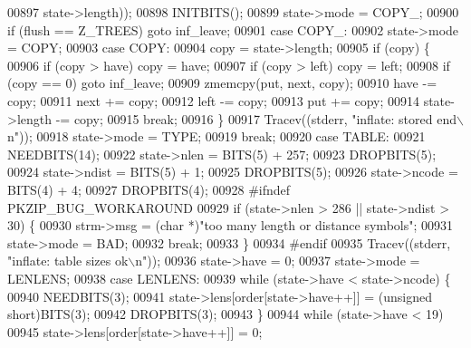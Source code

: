 \begin{DoxyCode}
{{{{{{{{00897                     state->length));
00898             INITBITS();
00899             state->mode = COPY\_;
00900             \textcolor{keywordflow}{if} (flush == Z\_TREES) \textcolor{keywordflow}{goto} inf\_leave;
00901         \textcolor{keywordflow}{case} COPY\_:
00902             state->mode = COPY;
00903         \textcolor{keywordflow}{case} COPY:
00904             copy = state->length;
00905             \textcolor{keywordflow}{if} (copy) \{
00906                 \textcolor{keywordflow}{if} (copy > have) copy = have;
00907                 \textcolor{keywordflow}{if} (copy > left) copy = left;
00908                 \textcolor{keywordflow}{if} (copy == 0) \textcolor{keywordflow}{goto} inf\_leave;
00909                 zmemcpy(put, next, copy);
00910                 have -= copy;
00911                 next += copy;
00912                 left -= copy;
00913                 put += copy;
00914                 state->length -= copy;
00915                 \textcolor{keywordflow}{break};
00916             \}
00917             Tracev((stderr, \textcolor{stringliteral}{"inflate:       stored end\(\backslash\)n"}));
00918             state->mode = TYPE;
00919             \textcolor{keywordflow}{break};
00920         \textcolor{keywordflow}{case} TABLE:
00921             NEEDBITS(14);
00922             state->nlen = BITS(5) + 257;
00923             DROPBITS(5);
00924             state->ndist = BITS(5) + 1;
00925             DROPBITS(5);
00926             state->ncode = BITS(4) + 4;
00927             DROPBITS(4);
00928 \textcolor{preprocessor}{#ifndef PKZIP\_BUG\_WORKAROUND}
00929             \textcolor{keywordflow}{if} (state->nlen > 286 || state->ndist > 30) \{
00930                 strm->msg = (\textcolor{keywordtype}{char} *)\textcolor{stringliteral}{"too many length or distance symbols"};
00931                 state->mode = BAD;
00932                 \textcolor{keywordflow}{break};
00933             \}
00934 \textcolor{preprocessor}{#endif}
00935             Tracev((stderr, \textcolor{stringliteral}{"inflate:       table sizes ok\(\backslash\)n"}));
00936             state->have = 0;
00937             state->mode = LENLENS;
00938         \textcolor{keywordflow}{case} LENLENS:
00939             \textcolor{keywordflow}{while} (state->have < state->ncode) \{
00940                 NEEDBITS(3);
00941                 state->lens[order[state->have++]] = (\textcolor{keywordtype}{unsigned} short)BITS(3);
00942                 DROPBITS(3);
00943             \}
00944             \textcolor{keywordflow}{while} (state->have < 19)
00945                 state->lens[order[state->have++]] = 0;
}}}}}}}}
\end{DoxyCode}
